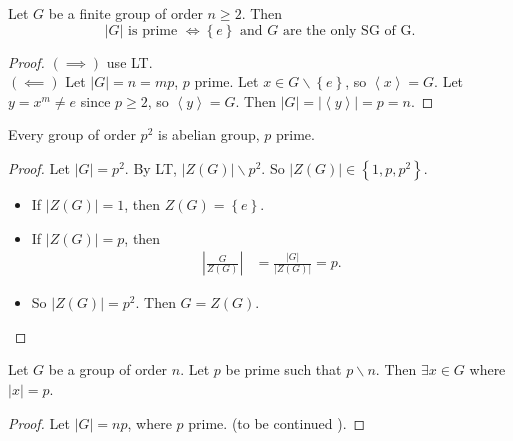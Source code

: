 \begin{proposition}[]
Let $G $ be a finite group of order $ n \geq 2 $. Then 
\[
\left| G \right|  \text{ is prime }  \iff  \left\{ e \right\} \text{ and }  G \text{ are the only SG of G.}  
\]
\end{proposition}
\begin{proof}
 $ ( \implies )  $ use LT.\\
 $ ( \impliedby  )  $ 
Let $\left| G \right|   = n = mp $, $p $ prime. Let $x \in   G \backslash  \left\{ e \right\} $, so $\left\langle x \right\rangle  = G $. Let $y = x^{m} \neq e $ since $p \geq 2 $, so $\left\langle y \right\rangle  = G. $ Then $\left| G \right|   = 
\left| \left\langle y \right\rangle  \right|  = p = n$.
\end{proof}
\begin{theorem}[]
Every group of order $p ^2  $ is abelian group, $p $ prime.
\end{theorem}
\begin{proof}
Let $\left| G \right|   = p ^2$. By LT, $\left| Z(G)  \right| \backslash p ^2$. So $\left| Z(G)  \right| \in   
\left\{ 1, p, p ^2  \right\}$. 
\begin{itemize}
  \item[\ding{182}] If $ \left| Z(G)  \right|   = 1$, then $Z(G)  = \left\{ e \right\} $.
  \item[\ding{183}] If $\left| Z(G)  \right|  = p  $, then 
    \begin{align*}
      \left| \frac{G}{Z(G) } \right|   &= 
      \frac{\left| G \right|  }{\left| Z(G)  \right|  } = p.
    \end{align*}
  \item[\ding{184}] So $\left| Z(G)  \right|  = p ^2 $. Then $G = Z(G)$. 
\end{itemize}
\end{proof}
\begin{theorem}
Let $G $ be a group of order $n $. Let $p $ be prime such that $p \backslash  n $. Then $\exists  x \in   G $ where 
$\left| x \right|   = p $. 
\end{theorem}
\begin{proof}
Let $\left| G \right|  =  np $, where $p $ prime. (to be continued ).
\end{proof}
